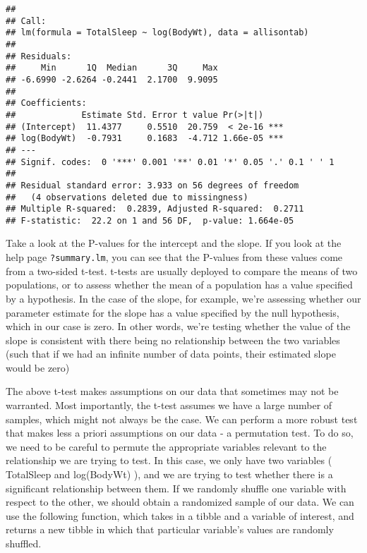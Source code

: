 \documentclass[
]{book}
\begin{document}
\begin{verbatim}
## 
## Call:
## lm(formula = TotalSleep ~ log(BodyWt), data = allisontab)
## 
## Residuals:
##     Min      1Q  Median      3Q     Max 
## -6.6990 -2.6264 -0.2441  2.1700  9.9095 
## 
## Coefficients:
##             Estimate Std. Error t value Pr(>|t|)    
## (Intercept)  11.4377     0.5510  20.759  < 2e-16 ***
## log(BodyWt)  -0.7931     0.1683  -4.712 1.66e-05 ***
## ---
## Signif. codes:  0 '***' 0.001 '**' 0.01 '*' 0.05 '.' 0.1 ' ' 1
## 
## Residual standard error: 3.933 on 56 degrees of freedom
##   (4 observations deleted due to missingness)
## Multiple R-squared:  0.2839, Adjusted R-squared:  0.2711 
## F-statistic:  22.2 on 1 and 56 DF,  p-value: 1.664e-05
\end{verbatim}

Take a look at the P-values for the intercept and the slope. If you look at the help page \texttt{?summary.lm}, you can see that the P-values from these values come from a two-sided t-test. t-tests are usually deployed to compare the means of two populations, or to assess whether the mean of a population has a value specified by a hypothesis. In the case of the slope, for example, we're assessing whether our parameter estimate for the slope has a value specified by the null hypothesis, which in our case is zero. In other words, we're testing whether the value of the slope is consistent with there being no relationship between the two variables (such that if we had an infinite number of data points, their estimated slope would be zero)

The above t-test makes assumptions on our data that sometimes may not be warranted. Most importantly, the t-test assumes we have a large number of samples, which might not always be the case. We can perform a more robust test that makes less a priori assumptions on our data - a permutation test. To do so, we need to be careful to permute the appropriate variables relevant to the relationship we are trying to test. In this case, we only have two variables ( TotalSleep and log(BodyWt) ), and we are trying to test whether there is a significant relationship between them. If we randomly shuffle one variable with respect to the other, we should obtain a randomized sample of our data. We can use the following function, which takes in a tibble and a variable of interest, and returns a new tibble in which that particular variable's values are randomly shuffled.
\end{document}
